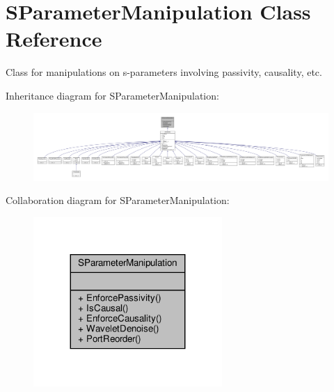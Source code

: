 \hypertarget{classSignalIntegrity_1_1SParameters_1_1SParameterManipulation_1_1SParameterManipulation}{}\section{S\+Parameter\+Manipulation Class Reference}
\label{classSignalIntegrity_1_1SParameters_1_1SParameterManipulation_1_1SParameterManipulation}


Class for manipulations on s-\/parameters involving passivity, causality, etc.  




Inheritance diagram for S\+Parameter\+Manipulation\+:
\nopagebreak
\begin{figure}[H]
\begin{center}
\leavevmode
\includegraphics[width=350pt]{classSignalIntegrity_1_1SParameters_1_1SParameterManipulation_1_1SParameterManipulation__inherit__graph}
\end{center}
\end{figure}


Collaboration diagram for S\+Parameter\+Manipulation\+:
\nopagebreak
\begin{figure}[H]
\begin{center}
\leavevmode
\includegraphics[width=203pt]{classSignalIntegrity_1_1SParameters_1_1SParameterManipulation_1_1SParameterManipulation__coll__graph}
\end{center}
\end{figure}
